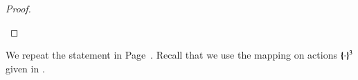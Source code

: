 \begin{proof}
\begin{enumerate}[1.]
	\end{enumerate}
\end{proof}



%

We repeat the statement in Page~\pageref{prop:op_corr_HOpp_to_HOp}.
Recall that we use the mapping on actions $\{\!\!\{\cdot\}\!\!\}^{3}$ given in .

\begin{proposition}\myrm
	\label{app:prop:op_corr_HOpp_to_HOp}
	
\end{proposition}

